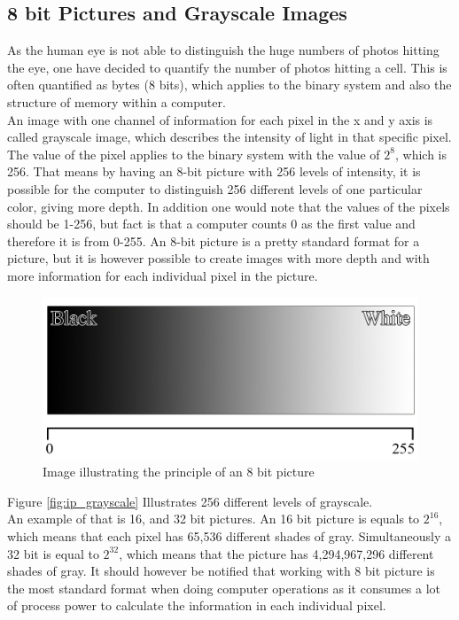 \subsection{8 bit Pictures and Grayscale Images}
As the human eye is not able to distinguish the huge numbers of photos hitting the eye, one have decided to quantify the number of photos hitting a cell. This is often quantified as bytes (8 bits), which applies to the binary system and also the structure of memory within a computer.\\
An image with one channel of information for each pixel in the x and y axis is called grayscale image, which describes the intensity of light in that specific pixel. The value of the pixel applies to the binary system with the value of $2^8$, which is 256. That means by having an 8-bit picture with 256 levels of intensity, it is possible for the computer to distinguish 256 different levels of one particular color, giving more depth. In addition one would note that the values of the pixels should be 1-256, but fact is that a computer counts 0 as the first value and therefore it is from 0-255. An 8-bit picture is a pretty standard format for a picture, but it is however possible to create images with more depth and with more information for each individual pixel in the picture.\\

\begin{figure}[htbp]
\centering
\includegraphics[width=1.00\textwidth]{Pictures/Theory/Grayscale.jpg}
\caption{Image illustrating the principle of an 8 bit picture}
\label{fig:ip_grayscale}
\end{figure}
Figure \eqref{fig:ip_grayscale} Illustrates 256 different levels of grayscale.\\

An example of that is 16, and 32 bit pictures. An 16 bit picture is equals to $2^{16}$, which means that each pixel has 65,536 different shades of gray. Simultaneously a 32 bit is equal to $2^{32}$, which means that the picture has 4,294,967,296 different shades of gray. It should however be notified that working with 8 bit picture is the most standard format when doing computer operations as it consumes a lot of process power to calculate the information in each individual pixel.
 
